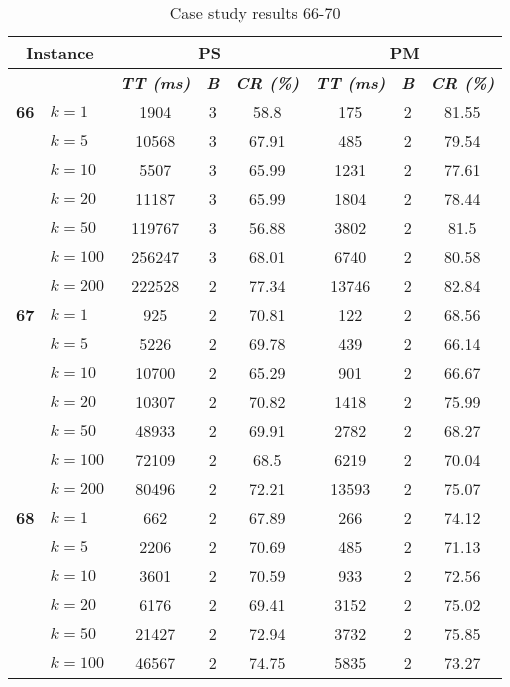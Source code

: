     \begin{table}[htbp]
    \caption{Case study results 66-70}
    \centering
    \begin{tabular}{|l|l|c|c|c|c|c|c|}
    \hline
    \multicolumn{ 2}{|c|}{\textbf{Instance}} & \multicolumn{ 3}{c|}{\textbf{PS}} & \multicolumn{ 3}{c|}{\textbf{PM}} \\ \hline
    \multicolumn{ 2}{|l|}{} & \textbf{\textit{TT (ms)}} & \textbf{\textit{B}} & \textbf{\textit{CR (\%)}} & \textbf{\textit{TT (ms)}} & \textbf{\textit{B}} & \textbf{\textit{CR (\%)}} \\ \hline
    \multicolumn{1}{|r|}{\textbf{66}} & $k=1$ & 1904 & 3 & 58.8 & 175 & 2 & 81.55 \\ 
     & $k=5$ & 10568 & 3 & 67.91 & 485 & 2 & 79.54 \\ 
     & $k=10$ & 5507 & 3 & 65.99 & 1231 & 2 & 77.61 \\ 
     & $k=20$ & 11187 & 3 & 65.99 & 1804 & 2 & 78.44 \\ 
     & $k=50$ & 119767 & 3 & 56.88 & 3802 & 2 & 81.5 \\ 
     & $k=100$ & 256247 & 3 & 68.01 & 6740 & 2 & 80.58 \\ 
     & $k=200$ & 222528 & 2 & 77.34 & 13746 & 2 & 82.84 \\ \hline
    \multicolumn{1}{|r|}{\textbf{67}} & $k=1$ & 925 & 2 & 70.81 & 122 & 2 & 68.56 \\ 
     & $k=5$ & 5226 & 2 & 69.78 & 439 & 2 & 66.14 \\ 
     & $k=10$ & 10700 & 2 & 65.29 & 901 & 2 & 66.67 \\ 
     & $k=20$ & 10307 & 2 & 70.82 & 1418 & 2 & 75.99 \\ 
     & $k=50$ & 48933 & 2 & 69.91 & 2782 & 2 & 68.27 \\ 
     & $k=100$ & 72109 & 2 & 68.5 & 6219 & 2 & 70.04 \\ 
     & $k=200$ & 80496 & 2 & 72.21 & 13593 & 2 & 75.07 \\ \hline
    \multicolumn{1}{|r|}{\textbf{68}} & $k=1$ & 662 & 2 & 67.89 & 266 & 2 & 74.12 \\ 
     & $k=5$ & 2206 & 2 & 70.69 & 485 & 2 & 71.13 \\ 
     & $k=10$ & 3601 & 2 & 70.59 & 933 & 2 & 72.56 \\ 
     & $k=20$ & 6176 & 2 & 69.41 & 3152 & 2 & 75.02 \\ 
     & $k=50$ & 21427 & 2 & 72.94 & 3732 & 2 & 75.85 \\ 
     & $k=100$ & 46567 & 2 & 74.75 & 5835 & 2 & 73.27 \\ 

\end{tabular}
\end{table}
